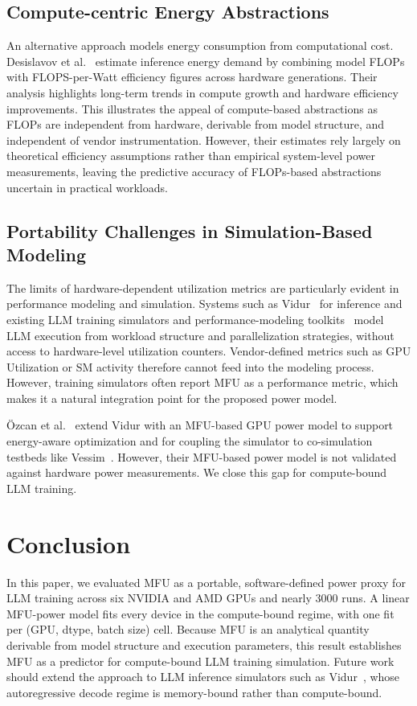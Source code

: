 \documentclass[10pt,conference,letterpaper]{IEEEtran}
\begin{document}
\subsection{Compute-centric Energy Abstractions}
An alternative approach models energy consumption from computational cost.
Desislavov et al.~\cite{desislavov-2023} estimate inference energy demand by combining model FLOPs with FLOPS-per-Watt efficiency figures across hardware generations.
Their analysis highlights long-term trends in compute growth and hardware efficiency improvements.
This illustrates the appeal of compute-based abstractions as FLOPs are independent from hardware, derivable from model structure, and independent of vendor instrumentation.
However, their estimates rely largely on theoretical efficiency assumptions rather than empirical system-level power measurements, leaving the predictive accuracy of FLOPs-based abstractions uncertain in practical workloads.

\subsection{Portability Challenges in Simulation-Based Modeling}
The limits of hardware-dependent utilization metrics are particularly evident in performance modeling and simulation.
Systems such as Vidur~\cite{agrawal-2025} for inference and existing LLM training simulators and performance-modeling toolkits~\cite{simumax, zhebrak2026llmclustersim, liang-2025} model LLM execution from workload structure and parallelization strategies, without access to hardware-level utilization counters.
Vendor-defined metrics such as GPU Utilization or SM activity therefore cannot feed into the modeling process.
However, training simulators often report MFU as a performance metric, which makes it a natural integration point for the proposed power model.

Özcan et al.~\cite{ozcan-2025} extend Vidur with an MFU-based GPU power model to support energy-aware optimization and for coupling the simulator to co-simulation testbeds like Vessim~\cite{wiesner2024vessim}.
However, their MFU-based power model is not validated against hardware power measurements. We close this gap for compute-bound LLM training.

\section{Conclusion}\label{Conclusion}
In this paper, we evaluated MFU as a portable, software-defined power proxy for LLM training across six NVIDIA and AMD GPUs and nearly 3000 runs.
A linear MFU-power model fits every device in the compute-bound regime, with one fit per (GPU, dtype, batch size) cell.
Because MFU is an analytical quantity derivable from model structure and execution parameters, this result establishes MFU as a predictor for compute-bound LLM training simulation.
Future work should extend the approach to LLM inference simulators such as Vidur~\cite{agrawal-2025}, whose autoregressive decode regime is memory-bound rather than compute-bound.
\end{document}
